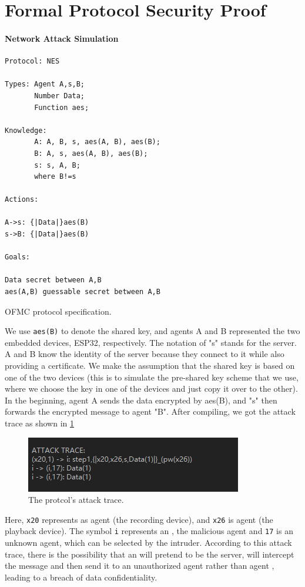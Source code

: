 \documentclass[conference]{IEEEtran}
\begin{document}
\section{Formal Protocol Security Proof}
\label{appendix:formal_protocol_security_proof}

\paragraph{Network Attack Simulation}

\begin{listing}[h]
\begin{verbatim}
Protocol: NES

Types: Agent A,s,B;
       Number Data;
       Function aes;

Knowledge: 
       A: A, B, s, aes(A, B), aes(B);
       B: A, s, aes(A, B), aes(B);
       s: s, A, B;
       where B!=s

Actions:

A->s: {|Data|}aes(B)
s->B: {|Data|}aes(B)

Goals:

Data secret between A,B
aes(A,B) guessable secret between A,B
\end{verbatim}
\caption{OFMC protocol specification.}
\end{listing}

We use \texttt{aes(B)} to denote the shared key, and agents A and B represented the two embedded devices, ESP32, respectively.
The notation of "s" stands for the server.
A and B know the identity of the server because they connect to it while also providing a certificate.
We make the assumption that the shared key is based on one of the two devices (this is to simulate the pre-shared key scheme that we use,
where we choose the key in one of the devices and just copy it over to the other).
In the beginning, agent A sends the data encrypted by aes(B), and "s" then forwards the encrypted message to agent "B".
After compiling, we got the attack trace as shown in \cref{fig:attack_trace}

\begin{figure}[h]
	\hspace*{0.4cm}
	\includegraphics[width=0.8\linewidth]{assets/attack trace.png}
	\vspace{-0.2cm}
	\caption{The protcol's attack trace.}
	\label{fig:attack_trace}
\end{figure}

Here, \texttt{x20} represents as agent  (the recording device), and \texttt{x26} is agent  (the playback device).
The symbol \texttt{i} represents an , the malicious agent and \texttt{17} is an unknown agent, which can be selected by the intruder.
According to this attack trace, there is the possibility that an  will pretend to be the server, will intercept the message and then send it to an unauthorized agent rather than agent , leading to a breach of data confidentiality.
\end{document}
